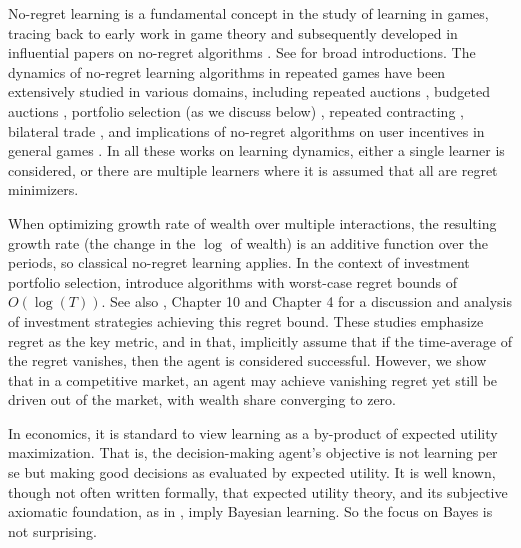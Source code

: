 No-regret learning is a fundamental concept in the study of learning in games, tracing back to early work in game theory \cite{blackwell1956analog,brown1951iterative,hannan1957lapproximation,robinson1951iterative} and subsequently developed in influential papers on no-regret algorithms \cite{DBLP:journals/siamcomp/AuerCFS02,blum2008regret,foster1997calibrated,fudenberg1995consistency,hart2000simple,kalai2005efficient}. See \cite{cesa2006prediction,hart2013simple,slivkins2019introduction} for broad introductions. The dynamics of no-regret learning algorithms in repeated games have been extensively studied in various domains, including repeated auctions \cite{aggarwal2024randomized,bichler2023convergence,daskalakis2016learning,guo2022no,feng2020convergence,deng2022nash,kolumbus2022auctions,kolumbus2024paying}, budgeted auctions \cite{balseiro2019learning,feng2024strategic,fikioris2023liquid,fikioris2024learning,lucier2024autobidders}, portfolio selection (as we discuss below) \cite{DBLP:journals/ml/BlumK99,gofer2016lower,hazan2015online,li2012expected}, repeated contracting \cite{collina2024repeated,guruganesh2024contracting,zhu2022sample}, bilateral trade \cite{cesa2023bilateral,cesa2021regret}, and implications of no-regret algorithms on user incentives in general games \cite{kolumbus2022and}. In all these works on learning dynamics, either a single learner is considered, or there are multiple learners where it is assumed that all are regret minimizers.

When optimizing growth rate of wealth over multiple interactions, the resulting  growth rate (the change in the $\log$ of wealth) is an additive function over the periods, so classical no-regret learning applies. In the context of investment portfolio selection, \cite{DBLP:journals/ml/BlumK99,hazan2015online} introduce  algorithms with 
worst-case regret bounds of $O(\log(T))$. See also \cite{cesa2006prediction}, Chapter 10 and \cite{hazan2016introduction} Chapter 4 for a  discussion and analysis of investment strategies achieving this regret bound. These studies emphasize regret as the key metric, and in that, implicitly assume that if the time-average of the regret vanishes, then the agent is considered successful. However, we show that in a competitive market, an agent may achieve vanishing regret yet still be driven out of the market, with wealth share converging to zero. 


 In economics, it is standard to view learning as a by-product of expected utility maximization. That is, the decision-making agent's objective is not learning per se but making good decisions as evaluated by expected utility. It is well known, though not often written formally, that expected utility theory, and its subjective axiomatic foundation, as in \cite{savage}, imply Bayesian learning. So the focus on Bayes is not surprising. 

